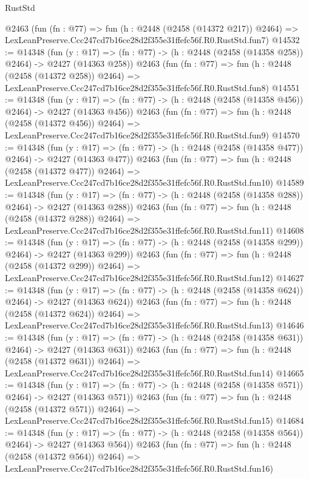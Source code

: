 \begin{lexlean}{RustStd}
\begin{coremodule}
    @2463
    (fun (fn : @77) =>
    fun (h : @2448 (@2458 (@14372 @217)) @2464) =>
    LexLeanPreserve.Ccc247cd7b16ce28d2f355e31ffefc56f.R0.RustStd.fun7)
@14532 := @14348
    (fun (y : @17) => (fn : @77) -> (h : @2448 (@2458 (@14358 @258)) @2464) -> @2427 (@14363 @258))
    @2463
    (fun (fn : @77) =>
    fun (h : @2448 (@2458 (@14372 @258)) @2464) =>
    LexLeanPreserve.Ccc247cd7b16ce28d2f355e31ffefc56f.R0.RustStd.fun8)
@14551 := @14348
    (fun (y : @17) => (fn : @77) -> (h : @2448 (@2458 (@14358 @456)) @2464) -> @2427 (@14363 @456))
    @2463
    (fun (fn : @77) =>
    fun (h : @2448 (@2458 (@14372 @456)) @2464) =>
    LexLeanPreserve.Ccc247cd7b16ce28d2f355e31ffefc56f.R0.RustStd.fun9)
@14570 := @14348
    (fun (y : @17) => (fn : @77) -> (h : @2448 (@2458 (@14358 @477)) @2464) -> @2427 (@14363 @477))
    @2463
    (fun (fn : @77) =>
    fun (h : @2448 (@2458 (@14372 @477)) @2464) =>
    LexLeanPreserve.Ccc247cd7b16ce28d2f355e31ffefc56f.R0.RustStd.fun10)
@14589 := @14348
    (fun (y : @17) => (fn : @77) -> (h : @2448 (@2458 (@14358 @288)) @2464) -> @2427 (@14363 @288))
    @2463
    (fun (fn : @77) =>
    fun (h : @2448 (@2458 (@14372 @288)) @2464) =>
    LexLeanPreserve.Ccc247cd7b16ce28d2f355e31ffefc56f.R0.RustStd.fun11)
@14608 := @14348
    (fun (y : @17) => (fn : @77) -> (h : @2448 (@2458 (@14358 @299)) @2464) -> @2427 (@14363 @299))
    @2463
    (fun (fn : @77) =>
    fun (h : @2448 (@2458 (@14372 @299)) @2464) =>
    LexLeanPreserve.Ccc247cd7b16ce28d2f355e31ffefc56f.R0.RustStd.fun12)
@14627 := @14348
    (fun (y : @17) => (fn : @77) -> (h : @2448 (@2458 (@14358 @624)) @2464) -> @2427 (@14363 @624))
    @2463
    (fun (fn : @77) =>
    fun (h : @2448 (@2458 (@14372 @624)) @2464) =>
    LexLeanPreserve.Ccc247cd7b16ce28d2f355e31ffefc56f.R0.RustStd.fun13)
@14646 := @14348
    (fun (y : @17) => (fn : @77) -> (h : @2448 (@2458 (@14358 @631)) @2464) -> @2427 (@14363 @631))
    @2463
    (fun (fn : @77) =>
    fun (h : @2448 (@2458 (@14372 @631)) @2464) =>
    LexLeanPreserve.Ccc247cd7b16ce28d2f355e31ffefc56f.R0.RustStd.fun14)
@14665 := @14348
    (fun (y : @17) => (fn : @77) -> (h : @2448 (@2458 (@14358 @571)) @2464) -> @2427 (@14363 @571))
    @2463
    (fun (fn : @77) =>
    fun (h : @2448 (@2458 (@14372 @571)) @2464) =>
    LexLeanPreserve.Ccc247cd7b16ce28d2f355e31ffefc56f.R0.RustStd.fun15)
@14684 := @14348
    (fun (y : @17) => (fn : @77) -> (h : @2448 (@2458 (@14358 @564)) @2464) -> @2427 (@14363 @564))
    @2463
    (fun (fn : @77) =>
    fun (h : @2448 (@2458 (@14372 @564)) @2464) =>
    LexLeanPreserve.Ccc247cd7b16ce28d2f355e31ffefc56f.R0.RustStd.fun16)

\end{coremodule}
\end{lexlean}
